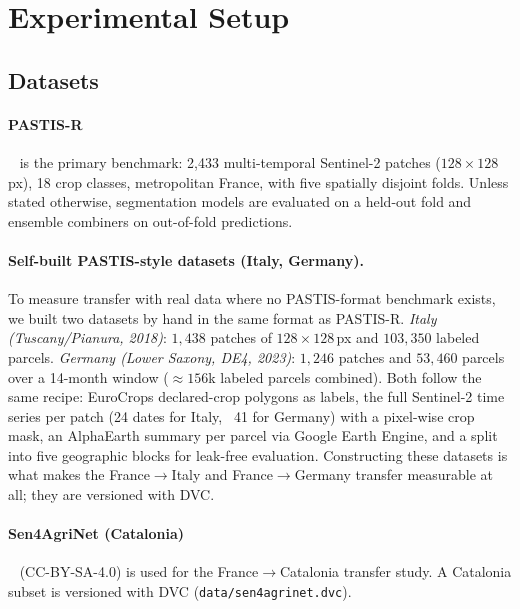 \section{Experimental Setup}
\label{sec:experiments}

\subsection{Datasets}
\paragraph{PASTIS-R}~\cite{garnot2021pastis} is the primary benchmark:
2{,}433 multi-temporal Sentinel-2 patches ($128\times128$ px), 18 crop
classes, metropolitan France, with five spatially disjoint folds.
Unless stated otherwise, segmentation models are evaluated on a
held-out fold and ensemble combiners on out-of-fold predictions.

\paragraph{Self-built PASTIS-style datasets (Italy, Germany).}
To measure transfer with real data where no PASTIS-format benchmark exists,
we built two datasets by hand in the same format as PASTIS-R. \emph{Italy
(Tuscany/Pianura, 2018)}: $1{,}438$ patches of $128\times128$\,px and
$103{,}350$ labeled parcels. \emph{Germany (Lower Saxony, DE4, 2023)}:
$1{,}246$ patches and $53{,}460$ parcels over a 14-month window ($\approx156$k
labeled parcels combined). Both follow the same recipe: EuroCrops declared-crop
polygons as labels, the full Sentinel-2 time series per patch (24 dates for Italy, ~41 for Germany) with a pixel-wise crop mask, an AlphaEarth summary per
parcel via Google Earth Engine, and a split into five geographic blocks for
leak-free evaluation. Constructing these datasets is what makes the
France$\rightarrow$Italy and France$\rightarrow$Germany transfer measurable at
all; they are versioned with DVC.

\paragraph{Sen4AgriNet (Catalonia)}~\cite{sykas2022sen4agrinet}
(CC-BY-SA-4.0) is used for the France$\rightarrow$Catalonia transfer
study. A Catalonia subset is versioned with DVC
(\texttt{data/sen4agrinet.dvc}).

